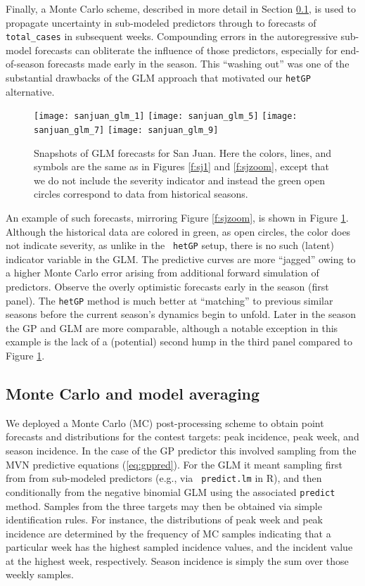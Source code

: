 \documentclass[12pt]{article}
\begin{document}
Finally, a Monte Carlo scheme, described in more detail in Section
\ref{sec:mc}, is used to propagate uncertainty in sub-modeled predictors
through to forecasts of \verb!total_cases! in subsequent weeks. Compounding
errors in the autoregressive sub-model forecasts can obliterate the influence
of those predictors, especially for end-of-season forecasts made early
in the season.  This ``washing out'' was one of the substantial drawbacks of
the GLM approach that motivated our {\tt hetGP} alternative.
\begin{figure}[ht!]
\centering
\texttt{[image: sanjuan\_glm\_1]}
\texttt{[image: sanjuan\_glm\_5]}
\texttt{[image: sanjuan\_glm\_7]}
\texttt{[image: sanjuan\_glm\_9]}
\caption{Snapshots of GLM forecasts for San Juan. Here the colors, lines, and
symbols are the same as in Figures  \ref{f:sj1} and \ref{f:sjzoom}, except
that we do not include the severity indicator and instead the green open
circles correspond to data from historical seasons. }
\label{f:sjzoomglm}
\end{figure}
An example of such forecasts, mirroring Figure \ref{f:sjzoom}, is shown in
Figure \ref{f:sjzoomglm}. Although the historical data are colored in green,
as open circles, the color does not indicate severity, as unlike in the {\tt
hetGP} setup, there is no such (latent) indicator variable in the GLM. The
predictive curves are more ``jagged'' owing to a higher Monte Carlo error
arising from additional forward simulation of predictors. Observe the overly
optimistic forecasts early in the season (first panel). The {\tt hetGP} method
is much better at ``matching'' to previous similar seasons before the current
season's dynamics begin to unfold.  Later in the season the GP and GLM are
more comparable, although a notable exception in this example is the lack of a
(potential) second hump in the third panel compared to Figure
\ref{f:sjzoomglm}. 

\subsection{Monte Carlo and model averaging}
\label{sec:mc}

We deployed a Monte Carlo (MC) post-processing scheme to obtain point
forecasts and distributions for the contest targets: peak incidence, peak
week, and season incidence.  In the case of the GP predictor this involved
sampling from the MVN predictive equations (\ref{eq:gppred}). For the GLM it
meant sampling first from from sub-modeled predictors (e.g., via {\tt
predict.lm} in {\sf R}), and then conditionally from the negative binomial GLM
using the associated {\tt predict} method. Samples from the three targets may
then be obtained via simple identification rules. For instance, the
distributions of peak week and peak incidence are determined by the frequency
of MC samples indicating that a particular week has the highest sampled
incidence values, and the incident value at the highest week, respectively.
Season incidence is simply the sum over those weekly samples.
\end{document}

